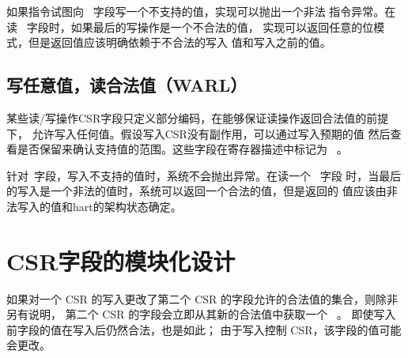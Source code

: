 如果指令试图向 \wlrl\ 字段写一个不支持的值，实现可以抛出一个非法
指令异常。在读 \wlrl\ 字段时，如果最后的写操作是一个不合法的值，
实现可以返回任意的位模式，但是返回值应该明确依赖于不合法的写入
值和写入之前的值。

\subsection*{写任意值，读合法值（WARL）}


某些读/写操作CSR字段只定义部分编码，在能够保证读操作返回合法值的前提下，
允许写入任何值。假设写入CSR没有副作用，可以通过写入预期的值
然后查看是否保留来确认支持值的范围。这些字段在寄存器描述中标记为 \warl\ 。


针对\warl\ 字段，写入不支持的值时，系统不会抛出异常。在读一个 \warl\ 字段
时，当最后的写入是一个非法的值时，系统可以返回一个合法的值，但是返回的
值应该由非法写入的值和hart的架构状态确定。

\section{CSR字段的模块化设计
}


如果对一个 CSR 的写入更改了第二个 CSR 的字段允许的合法值的集合，则除非另有说明，
第二个 CSR 的字段会立即从其新的合法值中获取一个 \unspecified\ 。 
即使写入前字段的值在写入后仍然合法，也是如此； 由于写入控制 CSR，该字段的值可能会更改。


